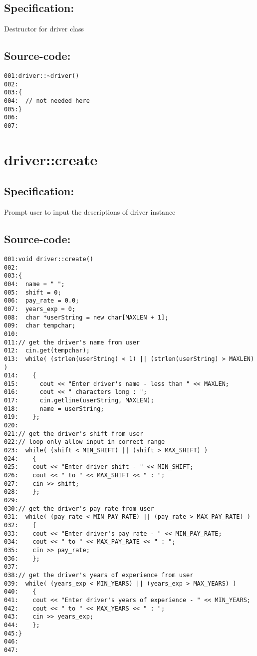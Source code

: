 \subsection*{Specification:}
Destructor for driver class
\subsection*{Source-code:}
\begin{verbatim}
001:driver::~driver()
002:
003:{
004:  // not needed here 
005:}
006:
007:
\end{verbatim}
\section{driver::create}
\subsection*{Specification:}
Prompt user to input the descriptions of driver instance
\subsection*{Source-code:}
\begin{verbatim}
001:void driver::create()
002:
003:{
004:  name = " ";
005:  shift = 0;
006:  pay_rate = 0.0;
007:  years_exp = 0;
008:  char *userString = new char[MAXLEN + 1];
009:  char tempchar;
010:
011:// get the driver's name from user
012:  cin.get(tempchar); 
013:  while( (strlen(userString) < 1) || (strlen(userString) > MAXLEN) )
014:    {
015:      cout << "Enter driver's name - less than " << MAXLEN;
016:      cout << " characters long : ";
017:      cin.getline(userString, MAXLEN);
018:      name = userString;
019:    };
020:
021:// get the driver's shift from user
022:// loop only allow input in correct range
023:  while( (shift < MIN_SHIFT) || (shift > MAX_SHIFT) )
024:    {
025:    cout << "Enter driver shift - " << MIN_SHIFT;
026:    cout << " to " << MAX_SHIFT << " : ";
027:    cin >> shift;
028:    };
029:
030:// get the driver's pay rate from user
031:  while( (pay_rate < MIN_PAY_RATE) || (pay_rate > MAX_PAY_RATE) )
032:    {
033:    cout << "Enter driver's pay rate - " << MIN_PAY_RATE;
034:    cout << " to " << MAX_PAY_RATE << " : ";
035:    cin >> pay_rate;
036:    };
037:
038:// get the driver's years of experience from user
039:  while( (years_exp < MIN_YEARS) || (years_exp > MAX_YEARS) )
040:    {
041:    cout << "Enter driver's years of experience - " << MIN_YEARS;
042:    cout << " to " << MAX_YEARS << " : ";
043:    cin >> years_exp;
044:    };
045:}
046:
047:
\end{verbatim}

